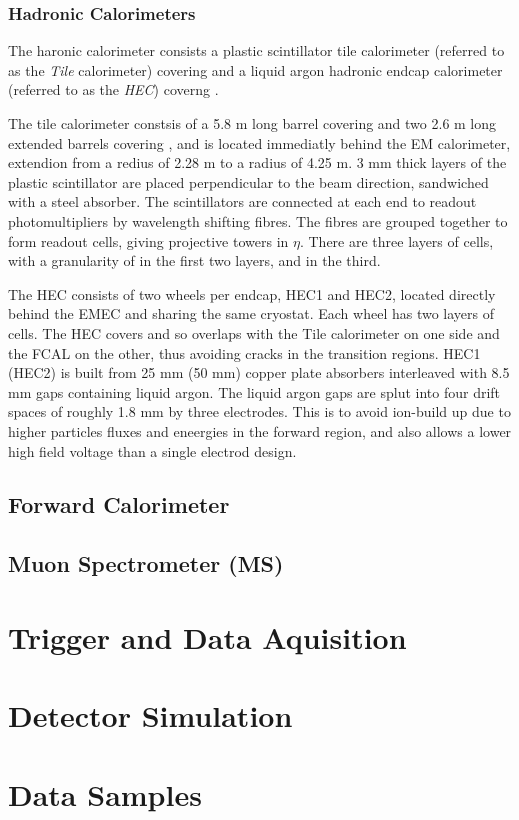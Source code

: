 \subsubsection{Hadronic Calorimeters}

The haronic calorimeter consists a plastic scintillator tile calorimeter 
(referred to as the {\it Tile} calorimeter) covering  and a liquid
argon hadronic endcap calorimeter (referred to as the {\it HEC}) coverng
. 

The tile calorimeter constsis of a 5.8 m long barrel covering
 and two 2.6 m long extended barrels covering , and
is located immediatly behind the EM calorimeter, extendion from a redius of
2.28 m to a radius of 4.25 m. 3 mm thick layers of the plastic scintillator are
placed perpendicular to the beam direction, sandwiched with a steel absorber.
The scintillators are connected at each end to
readout photomultipliers by wavelength shifting fibres. The fibres are grouped
together to form readout cells, giving projective towers in $\eta$. There are
three layers of cells, with a granularity of  in the
first two layers, and  in the third.

The HEC consists of two wheels per endcap, HEC1 and HEC2, located directly
behind the EMEC and sharing the same cryostat. Each wheel has two layers of
cells. The HEC covers  and so overlaps with the Tile
calorimeter on one side and the FCAL on the other, thus avoiding cracks in the
transition regions. HEC1 (HEC2) is built from 25 mm (50 mm) copper plate
absorbers interleaved with 8.5 mm gaps containing liquid argon. The liquid
argon gaps are splut into four drift spaces of roughly 1.8 mm by three
electrodes. This is to avoid ion-build up due to higher particles fluxes
and eneergies in the forward region, and also allows a lower high field voltage than a single
electrod design.

\subsection{Forward Calorimeter}


\subsection{Muon Spectrometer (MS)}
\section{Trigger and Data Aquisition}
\section{Detector Simulation}
\section{Data Samples}
